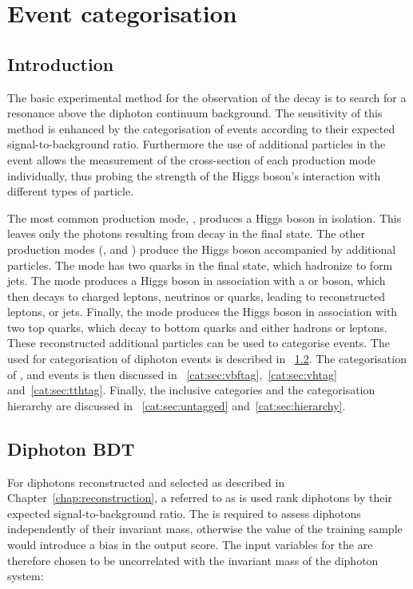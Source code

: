 \chapter{Event categorisation}
\label{chap:categorisation}

\section{Introduction}
\label{cat:sec:intro}

The basic experimental method for the observation of the \Hgg decay is to search for a resonance above the diphoton continuum background. The sensitivity of this method is enhanced by the categorisation of events according to their expected signal-to-background ratio. Furthermore the use of additional particles in the event allows the measurement of the cross-section of each production mode individually, thus probing the strength of the Higgs boson's interaction with different types of particle. %

The most common production mode, \ggH, produces a Higgs boson in isolation. This leaves only the photons resulting from \Hgg decay in the final state. The other production modes (\VBF, \VH and \ttH) produce the Higgs boson accompanied by additional particles. The \VBF mode has two quarks in the final state, which hadronize to form jets. The \VH mode produces a Higgs boson in association with a \PW or \PZ boson, which then decays to charged leptons, neutrinos or quarks, leading to reconstructed leptons, \MET or jets. Finally, the \ttH mode produces the Higgs boson in association with two top quarks, which decay to bottom quarks and either hadrons or leptons. These reconstructed additional particles can be used to categorise events. The \BDT used for categorisation of diphoton events is described in \Sec~\ref{cat:sec:dipho_bdt}. The categorisation of \VBF, \VH and \ttH events is then discussed in \Sec\s~\ref{cat:sec:vbftag},~\ref{cat:sec:vhtag} and~\ref{cat:sec:tthtag}. Finally, the inclusive \Untagged categories and the categorisation hierarchy are discussed in \Sec\s~\ref{cat:sec:untagged} and~\ref{cat:sec:hierarchy}.

\section{Diphoton BDT}
\label{cat:sec:dipho_bdt}

For diphotons reconstructed and selected as described in Chapter~\ref{chap:reconstruction}, a \BDT referred to as \DiPhoBdt is used rank diphotons by their expected signal-to-background ratio. The \DiPhoBdt is required to assess diphotons independently of their invariant mass, otherwise the \mH value of the training sample would introduce a bias in the output score. The input variables for the \DiPhoBdt are therefore chosen to be uncorrelated with the invariant mass of the diphoton system:

